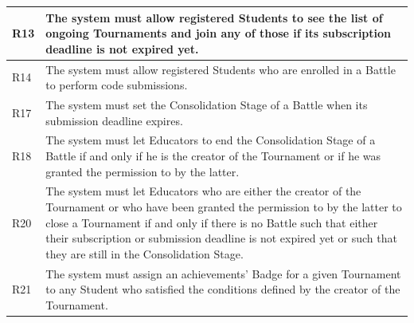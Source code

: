 \documentclass{Configuration_Files/Template}
\begin{document}
\begin{xltabular}{\textwidth}{| l | X |}
\hline
R13 & The system must allow registered Students to see the list of ongoing Tournaments and join any of those if its subscription deadline is not expired yet.\\ [1ex]
\hline
R14 & The system must allow registered Students who are enrolled in a Battle to perform code submissions.\\ [1ex]
\hline
R17 & The system must set the Consolidation Stage of a Battle when its submission deadline expires.\\ [1ex]
\hline
R18 & The system must let Educators to end the Consolidation Stage of a Battle if and only if he is the creator of the Tournament or if he was granted the permission to by the latter.\\ [1ex]
\hline
R20 & The system must let Educators who are either the creator of the Tournament or who have been granted the permission to by the latter to close a Tournament if and only if there is no Battle such that either their subscription or submission deadline is not expired yet or such that they are still in the Consolidation Stage.\\ [1ex]
\hline
R21 & The system must assign an achievements’ Badge for a given Tournament to any Student who satisfied the conditions defined by the creator of the Tournament.\\ [1ex]
\hline
\end{xltabular}
\end{document}
